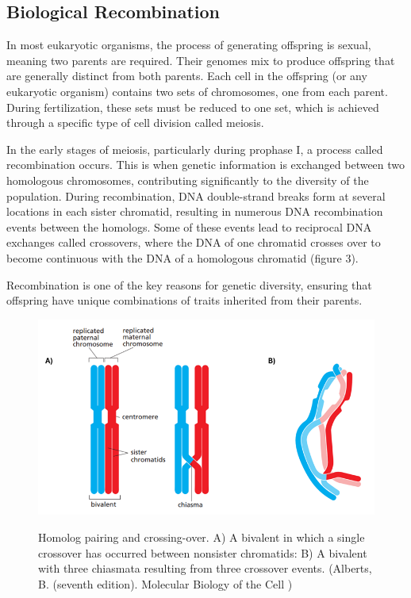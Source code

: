 \documentclass[12pt]{article}
\begin{document}
\subsection{Biological Recombination}

In most eukaryotic organisms, the process of generating offspring is sexual, meaning two parents are required. Their genomes mix to produce offspring that are generally distinct from both parents. Each cell in the offspring (or any eukaryotic organism) contains two sets of chromosomes, one from each parent. During fertilization, these sets must be reduced to one set, which is achieved through a specific type of cell division called meiosis.

In the early stages of meiosis, particularly during prophase I, a process called recombination occurs. This is when genetic information is exchanged between two homologous chromosomes, contributing significantly to the diversity of the population. During recombination, DNA double-strand breaks form at several locations in each sister chromatid, resulting in numerous DNA recombination events between the homologs. Some of these events lead to reciprocal DNA exchanges called crossovers, where the DNA of one chromatid crosses over to become continuous with the DNA of a homologous chromatid (figure 3).

Recombination is one of the key reasons for genetic diversity, ensuring that offspring have unique combinations of traits inherited from their parents.\\[6px]


\begin{figure}[H]
\centering
\includegraphics[scale=1]{Picture3}\\
\caption{Homolog pairing and crossing-over. A) A bivalent in which a
single crossover has occurred between nonsister chromatids: B) A bivalent with three chiasmata resulting from three crossover events. (Alberts, B. (seventh edition). Molecular Biology of the Cell
)}
\end{figure}
\end{document}
